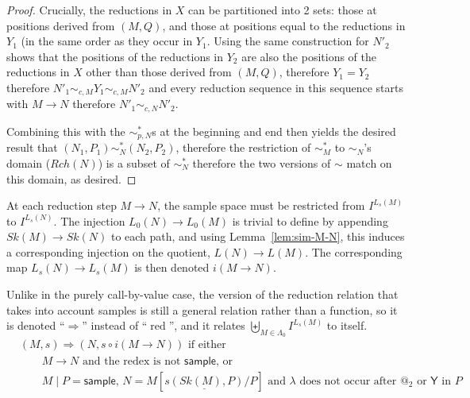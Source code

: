 \documentclass{article}
\newcommand{\tY}{\mathsf{Y}}
\newcommand{\tsample}{\mathsf{sample}}
\DeclareMathOperator{\red}{red}
\theoremstyle{definition}
\theoremstyle{lemma}
\theoremstyle{remark}
\begin{document}
\begin{proof}
Crucially, the reductions in $X$ can be partitioned into 2 sets: those at positions derived from $(M,Q)$, and those at positions equal to the reductions in $Y_1$ (in the same order as they occur in $Y_1$. Using the same construction for $N'_2$ shows that the positions of the reductions in $Y_2$ are also the positions of the reductions in $X$ other than those derived from $(M,Q)$, therefore $Y_1 = Y_2$ therefore $N'_1 \sim_{c,M} Y_1 \sim_{c,M} N'_2$ and every reduction sequence in this sequence starts with $M \to N$ therefore $N'_1 \sim_{c,N} N'_2$.

Combining this with the $\sim_{p,N}^*$s at the beginning and end then yields the desired result that $(N_1,P_1) \sim_N^* (N_2, P_2)$, therefore the restriction of $\sim_M^*$ to $\sim_N$'s domain ($Rch(N)$) is a subset of $\sim_N^*$ therefore the two versions of $\sim$ match on this domain, as desired.
\end{proof}


At each reduction step $M \to N$, the sample space must be restricted from $I^{L_s(M)}$ to $I^{L_s(N)}$. 
The injection $L_0(N) \to L_0(M)$ is trivial to define by appending $Sk(M) \to Sk(N)$ to each path, and using Lemma~\ref{lem:sim-M-N}, this induces a corresponding injection on the quotient, $L(N) \to L(M)$. 
The corresponding map $L_s(N) \to L_s(M)$ is then denoted $i(M \to N)$.

Unlike in the purely call-by-value case, the version of the reduction relation that takes into account samples is still a general relation rather than a function, so it is denoted ``$\Rightarrow$'' instead of ``$\red$'', and it relates $\biguplus_{M \in \Lambda_0} I^{L_s(M)}$ to itself.
\begin{align*}
& (M,s) \Rightarrow (N,s \circ i(M \to N)) \text{ if either} \\
& \qquad \text{$M \to N$ and the redex is not $\tsample$, or} \\
& \qquad \text{$M \mid P = \tsample$, $N = M[\underline{s(Sk(M),P)}/P]$ and $\lambda$ does not occur after $@_2$ or $\tY$ in $P$}
\end{align*}
\end{document}
